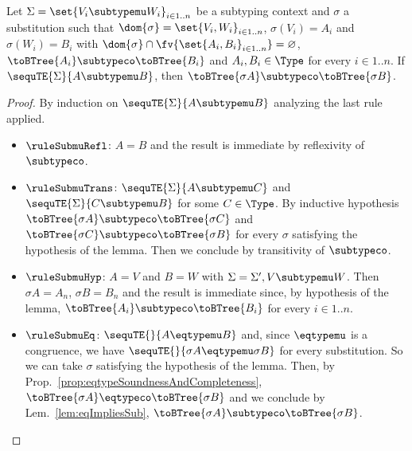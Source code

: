 \begin{lemma}
\label{lem:subtypeSoundnessWithHypothesis}
Let $\Sigma = \set{V_i \subtypemu W_i}_{i \in 1..n}$ be a subtyping context
and $\sigma$ a substitution such that $\dom{\sigma} = \set{V_i, W_i}_{i \in
1..n}$, $\sigma(V_i) = A_i$ and $\sigma(W_i) = B_i$ with $\dom{\sigma} \cap
\fv{\set{A_i, B_i}_{i \in 1..n}} = \varnothing$, $\toBTree{A_i} \subtypeco
\toBTree{B_i}$ and $A_i, B_i \in \Type$ for every $i \in 1..n$.
If $\sequTE{\Sigma}{A \subtypemu B}$, then $\toBTree{\sigma A} \subtypeco
\toBTree{\sigma B}$.
\end{lemma}

\begin{proof}
By induction on $\sequTE{\Sigma}{A \subtypemu B}$ analyzing the last rule
applied.
\begin{itemize}
  \item $\ruleSubmuRefl$: $A = B$ and the result is immediate by reflexivity of
  $\subtypeco$.
  
  \item $\ruleSubmuTrans$: $\sequTE{\Sigma}{A \subtypemu C}$ and
  $\sequTE{\Sigma}{C \subtypemu B}$ for some $C \in \Type$. By inductive
  hypothesis $\toBTree{\sigma A} \subtypeco \toBTree{\sigma C}$ and
  $\toBTree{\sigma C} \subtypeco \toBTree{\sigma B}$ for every $\sigma$
  satisfying the hypothesis of the lemma. Then we conclude by transitivity of
  $\subtypeco$.
  
  \item $\ruleSubmuHyp$: $A = V$ and $B = W$ with $\Sigma = \Sigma', V
  \subtypemu W$. Then $\sigma A = A_n$, $\sigma B = B_n$ and the result is
  immediate since, by hypothesis of the lemma, $\toBTree{A_i} \subtypeco
  \toBTree{B_i}$ for every $i \in 1..n$.
  
  \item $\ruleSubmuEq$: $\sequTE{}{A \eqtypemu B}$ and, since $\eqtypemu$ is a
  congruence, we have $\sequTE{}{\sigma A \eqtypemu \sigma B}$ for every
  substitution. So we can take $\sigma$ satisfying the hypothesis of the lemma.
  Then, by Prop.~\ref{prop:eqtypeSoundnessAndCompleteness}, $\toBTree{\sigma A}
  \eqtypeco \toBTree{\sigma B}$ and we conclude by Lem.~\ref{lem:eqImpliesSub},
  $\toBTree{\sigma A} \subtypeco \toBTree{\sigma B}$.
  

\end{itemize}
\end{proof}
